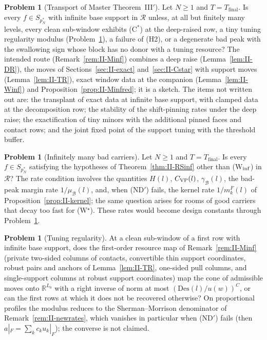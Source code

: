 \documentclass[10pt]{amsart}
\theoremstyle{definition}
\newtheorem{problem}[theorem]{Problem}
\theoremstyle{remark}
\newcommand{\R}{\mathbb R}
\newcommand{\Rec}{\mathcal R}
\begin{document}
\begin{problem}[Transport of Master Theorem~III$'$]\label{prob:II-Minf}
Let $N\ge1$ and $T=T_{\mathrm{final}}$.  Is every $f\in S_{p_N^*}$ with
infinite base support in $\Rec$ unless, at all but finitely many levels,
every clean sub-window exhibits (C$^*$) at the deep-raised row, a tiny
tuning regularity modulus (Problem~\ref{prob:II-tuning}), a failure of
(H2), or a degenerate bad peak with the swallowing sign whose block has no
donor with a tuning resource?  The intended route
(Remark~\ref{rem:II-Minf}) combines a deep raise (Lemma~\ref{lem:II-DR}),
the moves of Sections~\ref{sec:II-exact} and~\ref{sec:II-Cstar} with support
moves (Lemma~\ref{lem:II-TR}), exact window data at the companion
(Lemma~\ref{lem:II-Winf}) and Proposition~\ref{prop:II-Minfred}; it is a
sketch.  The items not written out are: the transplant of exact data at
infinite base support, with clamped data at the decomposition row; the
stability of the shift-pinning rates under the deep raise; the
exactification of tiny minors with the additional pinned faces and contact
rows; and the joint fixed point of the support tuning with the threshold
buffer.
\end{problem}

\begin{problem}[Infinitely many bad carriers]\label{prob:II-Winf}
Let $N\ge1$ and $T=T_{\mathrm{final}}$.  Is every $f\in S_{p_N^*}$ satisfying
the hypotheses of Theorem~\ref{thm:II-RSinf} other than
\textup{(W$_{\rm inf}$)} in $\Rec$?  The rate condition involves the
quantities $H(l)$, $C_{\rm VP}(l)$, $\gamma_{\mathcal B}(l)$, the bad-peak
margin rate $1/\mu_{\mathcal B}(l)$, and, when (ND$'$) fails, the kernel rate
$1/m^F_k(l)$ of Proposition~\ref{prop:II-kernel}; the same question arises
for rooms of good carriers that decay too fast for (W$^\star$).  These
rates would become design constants through Problem~\ref{prob:II-Minf}.
\end{problem}

\begin{problem}[Tuning regularity]\label{prob:II-tuning}
At a clean sub-window of a first row with infinite base support, does the
first-order resource map of Remark~\ref{rem:II-Minf} (private two-sided
columns of contacts, convertible thin support coordinates, robust pairs
and anchors of Lemma~\ref{lem:II-TR}, one-sided pull columns, and
single-support columns at robust support coordinates) map the cone of
admissible moves onto $\R^{L_0}$ with a right inverse of norm at most
$(\mathrm{Des}(l)/u(w))^C$, or can the first rows at which it does not be
recovered otherwise?  On proportional profiles the modulus reduces to the
Sherman--Morrison denominator of Remark~\ref{rem:II-newrates}, which
vanishes in particular when (ND$'$) fails (then $a|_F=\sum_kc_ku_k|_F$); the
converse is not claimed.
\end{problem}
\end{document}
